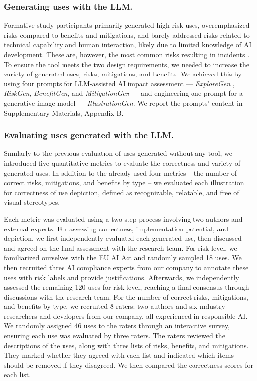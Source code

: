 \subsubsection{Generating uses with the LLM.}
Formative study participants primarily generated high-risk uses, overemphasized risks compared to benefits and mitigations, and barely addressed risks related to technical capability and human interaction, likely due to limited knowledge of AI development. These are, however, the most common risks resulting in incidents \cite{mcgregor2021preventing}. To ensure the tool meets the two design requirements, we needed to increase the variety of generated uses, risks, mitigations, and benefits. We achieved this by using four prompts for LLM-assisted AI impact assessment — \emph{ExploreGen} \cite{herdel2024exploregen}, \emph{RiskGen}, \emph{BenefitGen}, and \emph{MitigationGen} \cite{constantinides2024_risks_benefits, AIDesign2024} — and engineering one prompt for a generative image model — \emph{IllustrationGen}. We report the prompts' content in Supplementary Materials, Appendix B.

\subsubsection{Evaluating uses generated with the LLM.}
Similarly to the previous evaluation of uses generated without any tool, we introduced five quantitative metrics to evaluate the correctness and variety of generated uses. In addition to the already used four metrics -- the number of correct risks, mitigations, and benefits by type -- we evaluated each illustration for correctness of use depiction, defined as recognizable, relatable, and free of visual stereotypes.

Each metric was evaluated using a two-step process involving two authors and external experts. For assessing correctness, implementation potential, and depiction, we first independently evaluated each generated use, then discussed and agreed on the final assessment with the research team. For risk level, we familiarized ourselves with the EU AI Act \cite{EUACT2024} and randomly sampled 18 uses. We then recruited three AI compliance experts from our company to annotate these uses with risk labels and provide justifications. Afterwards, we independently assessed the remaining 120 uses for risk level, reaching a final consensus through discussions with the research team. For the number of correct risks, mitigations, and benefits by type, we recruited 8 raters: two authors and six industry researchers and developers from our company, all experienced in responsible AI. We randomly assigned 46 uses to the raters through an interactive survey, ensuring each use was evaluated by three raters. The raters reviewed the descriptions of the uses, along with three lists of risks, benefits, and mitigations. They marked whether they agreed with each list and indicated which items should be removed if they disagreed. We then compared the correctness scores for each list.

